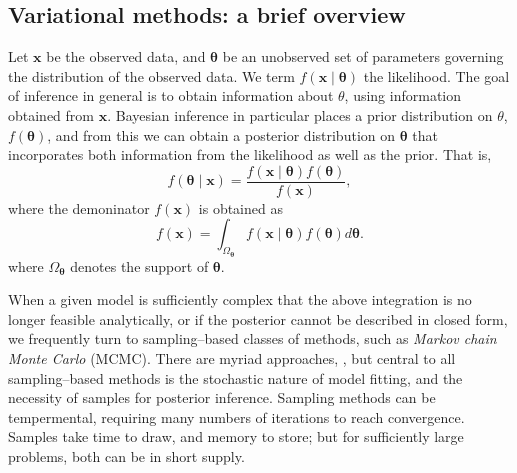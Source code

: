 \subsection{Variational methods: a brief overview\label{ref:varbayes}}
Let $\bm{x}$ be the observed data, and $\bm{\theta}$ be an unobserved set of 
    parameters governing the distribution of the observed data.  We term 
    $f(\bm{x}\mid\bm{\theta})$ the likelihood.  The goal of inference in 
    general is to obtain information about $\theta$, using information 
    obtained from $\bm{x}$. Bayesian inference in particular places a prior
    distribution on $\theta$, $f(\bm{\theta})$, and from this we can obtain a
    posterior distribution on $\bm{\theta}$ that incorporates both information
    from the likelihood as well as the prior.  That is,
    \[
        f(\bm{\theta}\mid\bm{x}) = 
            \frac{f(\bm{x}\mid\bm{\theta})f(\bm{\theta})}{f(\bm{x})},
    \]
    where the demoninator $f(\bm{x})$ is obtained as
    \[
        f(\bm{x}) = 
            \int_{\Omega_\bm{\theta}}f(\bm{x}\mid\bm{\theta})f(\bm{\theta})d\bm{\theta}.
    \]
    where $\Omega_{\bm{\theta}}$ denotes the support of $\bm{\theta}$.

When a given model is sufficiently complex that the above integration is no
    longer feasible analytically, or if the posterior cannot be described in
    closed form, we frequently 
    turn to sampling--based classes of methods, such as 
    \emph{Markov chain Monte Carlo} (MCMC)\needcite. There are myriad approaches, 
    , but central to all sampling--based 
    methods is the stochastic nature of model fitting, and the 
    necessity of samples for posterior inference.  Sampling methods can be 
    tempermental, requiring many numbers of iterations to reach convergence.
    Samples take time to draw, and memory to store; but for sufficiently large 
    problems, both can be in short supply.


